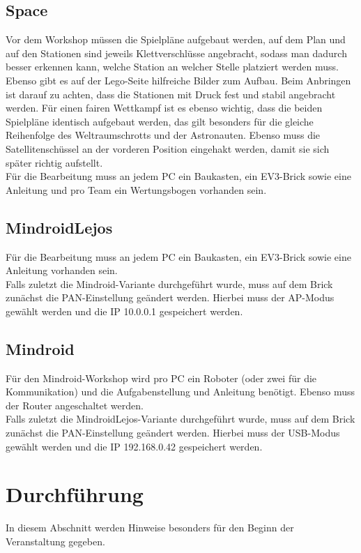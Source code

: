 \documentclass[
	ngerman,
	accentcolor=1c,%
	]{tudapub}
\begin{document}
\subsection{Space}
Vor dem Workshop m\"ussen die Spielpl\"ane aufgebaut werden, auf dem Plan und auf den Stationen sind jeweils Klettverschl\"usse angebracht, sodass man dadurch besser erkennen kann, welche Station an welcher Stelle platziert werden muss. Ebenso gibt es auf der Lego-Seite hilfreiche Bilder zum Aufbau. Beim Anbringen ist darauf zu achten, dass die Stationen mit Druck fest und stabil angebracht werden. \newline
F\"ur einen fairen Wettkampf ist es ebenso wichtig, dass die beiden Spielpl\"ane identisch aufgebaut werden, das gilt besonders f\"ur die gleiche Reihenfolge des Weltraumschrotts und der Astronauten. Ebenso muss die Satellitensch\"ussel an der vorderen Position eingehakt werden, damit sie sich sp\"ater richtig aufstellt.\\
F\"ur die Bearbeitung muss an jedem PC ein Baukasten, ein EV3-Brick sowie eine Anleitung und pro Team ein Wertungsbogen vorhanden sein.

\subsection{MindroidLejos}
F\"ur die Bearbeitung muss an jedem PC ein Baukasten, ein EV3-Brick sowie eine Anleitung vorhanden sein.\\
Falls zuletzt die Mindroid-Variante durchgef\"uhrt wurde, muss auf dem Brick zun\"achst die PAN-Einstellung ge\"andert werden. Hierbei muss der AP-Modus gew\"ahlt werden und die IP 10.0.0.1 gespeichert werden.

\subsection{Mindroid}
F\"ur den Mindroid-Workshop wird pro PC ein Roboter (oder zwei f\"ur die Kommunikation) und die Aufgabenstellung und Anleitung ben\"otigt. Ebenso muss der Router angeschaltet werden.\\
Falls zuletzt die MindroidLejos-Variante durchgef\"uhrt wurde, muss auf dem Brick zun\"achst die PAN-Einstellung ge\"andert werden. Hierbei muss der USB-Modus gew\"ahlt werden und die IP 192.168.0.42 gespeichert werden.

\section{Durchf\"uhrung}
In diesem Abschnitt werden Hinweise besonders f\"ur den Beginn der Veranstaltung gegeben.
\end{document}
